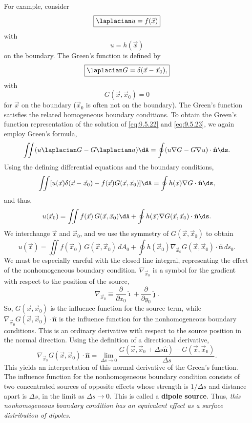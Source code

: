 For example, consider
\begin{equation}
\label{eq:9.5.22}
\boxed{\laplacian u = f(\vec{x})}
\end{equation}
with
\begin{equation}
\label{eq:9.5.23}
\boxed{u = h(\vec{x})}
\end{equation}
on the boundary.  The Green's function is defined by
\begin{equation}
\label{eq:9.5.24}
\boxed{\laplacian G = \delta(\vec{x}-\vec{x}_0),}
\end{equation}
with
\begin{equation}
\label{eq:9.5.25}
\boxed{G(\vec{x},\vec{x}_0) = 0}
\end{equation}
for $\vec{x}$ on the boundary ($\vec{x}_0$ is often not on the boundary).  The Green's function satisfies the related homogeneous boundary conditions.  To obtain the Green's function representation of the solution of \eqref{eq:9.5.22} and \eqref{eq:9.5.23}, we again employ Green's formula,
\[
\iint (u\laplacian G - G\laplacian u)\dA = \oint (u\nabla G - G\nabla u)\cdot\hat{\mathbf{n}}\ds.
\]
Using the defining differential equations and the boundary conditions,
\[
\iint [u(\vec{x})\delta(\vec{x}-\vec{x}_0) - f(\vec{x})G(\vec{x},\vec{x}_0)]\dA = \oint h(\vec{x})\nabla G\cdot\hat{\mathbf{n}}\ds,
\]
and thus,
\[
u(\vec{x}_0) = \iint f(\vec{x})\,G(\vec{x},\vec{x}_0)\dA + \oint h(\vec{x})\nabla G(\vec{x},\vec{x}_0)\cdot\hat{\mathbf{n}}\ds.
\]
We interchange $\vec{x}$ and $\vec{x}_0$, and we use the symmetry of $G(\vec{x},\vec{x}_0)$ to obtain
\begin{equation}
\label{eq:9.5.26}
\boxed{u(\vec{x}) = \iint f(\vec{x}_0)\,G(\vec{x},\vec{x}_0)\,dA_0 + \oint h(\vec{x}_0)\nabla_{\vec{x}_0}G(\vec{x},\vec{x}_0)\cdot\hat{\mathbf{n}}\,ds_0.}
\end{equation}
We must be especially careful with the closed line integral, representing the effect of the nonhomogeneous boundary condition.  $\nabla_{\vec{x}_0}$ is a symbol for the gradient with respect to the position of the source,
\[
\nabla_{\vec{x}_0} \equiv \frac{\partial}{\partial x_0}\hat{\imath} + \frac{\partial}{\partial y_0}\hat{\jmath}.
\]
So, $G(\vec{x},\vec{x}_0)$ is the influence function for the source term, while $\nabla_{\vec{x}_0}G(\vec{x},\vec{x}_0)\cdot\hat{\mathbf{n}}$ is the influence function for the nonhomogeneous boundary conditions.  This is an ordinary derivative with respect to the source position in the normal direction.  Using the definition of a directional derivative,
\[
\nabla_{\vec{x}_0}G(\vec{x},\vec{x}_0)\cdot\hat{\mathbf{n}} = \lim_{\Delta s \to 0}\frac{G(\vec{x},\vec{x}_0+\Delta s\hat{\mathbf{n}}) - G(\vec{x},\vec{x}_0)}{\Delta s}.
\]
This yields an interpretation of this normal derivative of the Green's function.  The influence function for the nonhomogeneous boundary condition consists of two concentrated sources of opposite effects whose strength is $1/\Delta s$ and distance apart is $\Delta s$, in the limit as $\Delta s \to 0$.  This is called a \textbf{dipole source}.  Thus, \emph{this nonhomogeneous boundary condition has an equivalent effect as a surface distribution of dipoles}.

